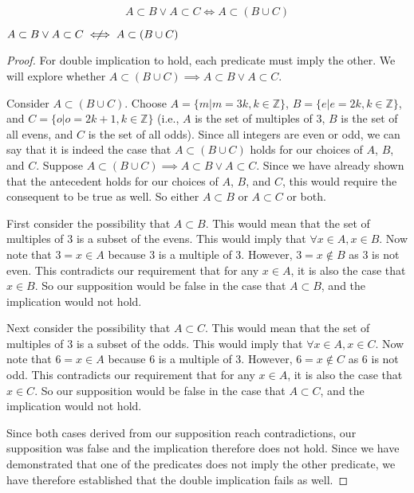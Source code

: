 \documentclass[main.tex]{subfiles}
\begin{document}
\subproblem{}\label{2b}
\[A \subset B \lor A \subset C \iff A \subset (B \cup C)\]
\begin{thm}
	\(A \subset B \lor A \subset C \centernot\iff A \subset (B \cup C)\)
\end{thm}
\begin{proof}
	For double implication to hold, each predicate must imply the other. We
	will explore whether
	\(A \subset (B \cup C) \implies A \subset B \lor A \subset C\).

	Consider \(A \subset (B \cup C)\). Choose
	\(A = \{m | m = 3k, k \in \mathbb{Z}\}\),
	\(B = \{e | e = 2k, k \in \mathbb{Z}\}\),
	and \(C = \{o | o = 2k + 1, k \in \mathbb{Z}\}\) (i.e., \(A\) is the set
	of multiples of	3, \(B\) is the set of all evens, and \(C\) is the set
	of all odds). Since all integers are even or odd, we can say that it is
	indeed the case that \(A \subset (B \cup C)\) holds for our choices of
	\(A\), \(B\), and \(C\). Suppose
	\(A \subset (B \cup C) \implies A \subset B \lor A \subset C\). Since
	we have already shown that the antecedent holds for our choices of
	\(A\), \(B\), and \(C\), this would require the consequent to be true as
	well. So either \(A \subset B\) or \(A \subset C\) or both.

	First consider the possibility that \(A \subset B\). This would mean
	that the set of multiples of 3 is a subset of the evens. This would
	imply that \(\forall x \in A, x \in B\). Now note that \(3 = x \in A\)
	because 3 is a multiple of 3. However, \(3 = x \notin B\) as 3 is not
	even. This contradicts our requirement that for any \(x \in A\), it is
	also the case that \(x \in B\). So our supposition would be false in the
	case that \(A \subset B\), and the implication would not hold.

	Next consider the possibility that \(A \subset C\). This would mean
	that the set of multiples of 3 is a subset of the odds. This would imply
	that \(\forall x \in A, x \in C\). Now note that \(6 = x \in A\) because
	6 is a multiple of 3. However, \(6 = x \notin C\) as 6 is not odd. This
	contradicts our requirement that for any \(x \in A\), it is also the
	case that \(x \in C\). So our supposition would be false in the case
	that \(A \subset C\), and the implication would not hold.

	Since both cases derived from our supposition reach contradictions, our
	supposition was false and the implication therefore does not hold. Since
	we have demonstrated that one of the predicates does not imply the other
	predicate, we have therefore established that the double implication
	fails as well.
\end{proof}
\end{document}
